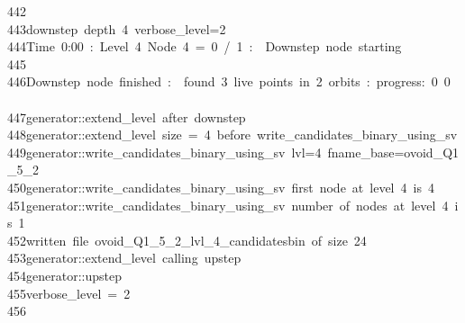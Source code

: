 \begin{tabbing}
442\>\\[0pt]
443\>downstep\ depth\ 4\ verbose\_level=2\\[0pt]
444\>Time\ 0:00\ :\ Level\ 4\ Node\ 4\ =\ 0\ /\ 1\ :\ \ Downstep\ node\ starting\\[0pt]
445\>\\[0pt]
446\>Downstep\ node\ finished\ :\ \ found\ 3\ live\ points\ in\ 2\ orbits\ :\ progress:\ 0\ 0\ \ \\[0pt]
447\>generator::extend\_level\ after\ downstep\\[0pt]
448\>generator::extend\_level\ size\ =\ 4\ before\ write\_candidates\_binary\_using\_sv\\[0pt]
449\>generator::write\_candidates\_binary\_using\_sv\ lvl=4\ fname\_base=ovoid\_Q1\_5\_2\\[0pt]
450\>generator::write\_candidates\_binary\_using\_sv\ first\ node\ at\ level\ 4\ is\ 4\\[0pt]
451\>generator::write\_candidates\_binary\_using\_sv\ number\ of\ nodes\ at\ level\ 4\ is\ 1\\[0pt]
452\>written\ file\ ovoid\_Q1\_5\_2\_lvl\_4\_candidatesbin\ of\ size\ 24\\[0pt]
453\>generator::extend\_level\ calling\ upstep\\[0pt]
454\>generator::upstep\\[0pt]
455\>verbose\_level\ =\ 2\\[0pt]
456\>\\[0pt]

\end{tabbing}
